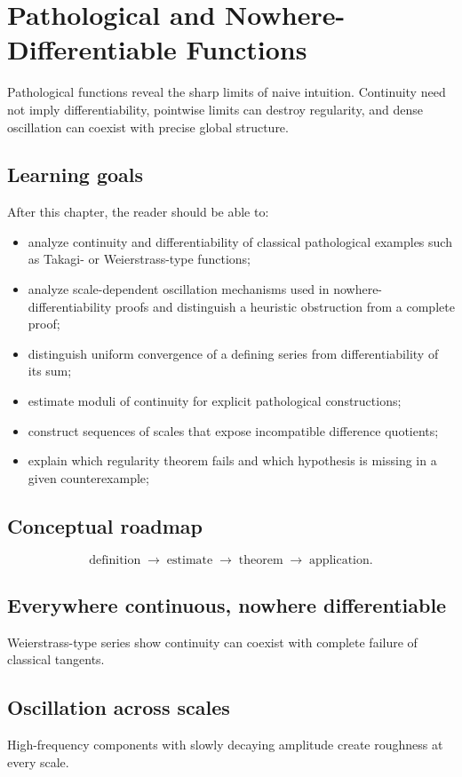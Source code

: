 \chapter{Pathological and Nowhere-Differentiable Functions}
\label{ch:ii15}

Pathological functions reveal the sharp limits of naive intuition. Continuity need not imply differentiability, pointwise limits can destroy regularity, and dense oscillation can coexist with precise global structure.

\section*{Learning goals}
After this chapter, the reader should be able to:
\begin{itemize}
\item analyze continuity and differentiability of classical pathological examples such as Takagi- or Weierstrass-type functions;
\item analyze scale-dependent oscillation mechanisms used in nowhere-differentiability proofs and distinguish a heuristic obstruction from a complete proof;
\item distinguish uniform convergence of a defining series from differentiability of its sum;
\item estimate moduli of continuity for explicit pathological constructions;
\item construct sequences of scales that expose incompatible difference quotients;
\item explain which regularity theorem fails and which hypothesis is missing in a given counterexample;
\end{itemize}
\section*{Conceptual roadmap}
\[
\boxed{\text{definition}\;\longrightarrow\;\text{estimate}\;\longrightarrow\;\text{theorem}\;\longrightarrow\;\text{application}.}
\]

\section{Everywhere continuous, nowhere differentiable}
Weierstrass-type series show continuity can coexist with complete failure of classical tangents.

\section{Oscillation across scales}
High-frequency components with slowly decaying amplitude create roughness at every scale.


